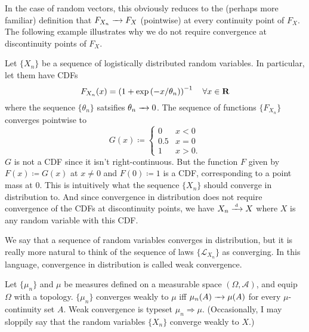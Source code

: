 \documentclass[11pt,letterpaper,reqno,oneside]{article}
\begin{document}
In the case of random vectors, this obviously reduces to the (perhaps more familiar) definition that $F_{X_n} \xrightarrow{\;\;\;} F_X$ (pointwise) at every continuity point of $F_X$. The following example illustrates why we do not require convergence at discontinuity points of $F_X$.
%
\begin{example}
	Let $\{X_n\}$ be a sequence of logistically distributed random variables. In particular, let them have CDFs
	\begin{equation*}
		F_{X_n}(x) = \left( 1 + \exp\left( -x / \theta_n \right) \right)^{-1}
		\quad\forall x \in \mathbf{R}
	\end{equation*}
	where the sequence $\{\theta_n\}$ satsifies $\theta_n \xrightarrow{\;\;\;} 0$. The sequence of functions $\{ F_{X_n} \}$ converges pointwise to
	\begin{equation*}
		G(x) \coloneqq
		\begin{cases}
			0 & x < 0 \\
			0.5 & x = 0 \\
			1 & x > 0 .
		\end{cases} 
	\end{equation*}
	$G$ is not a CDF since it isn't right-continuous. But the function $F$ given by $F(x) \coloneqq G(x)$ at $x \neq 0$ and $F(0) \coloneqq 1$ is a CDF, corresponding to a point mass at $0$. This is intuitively what the sequence $\{ X_n \}$ should converge in distribution to. And since convergence in distribution does not require convergence of the CDFs at discontinuity points, we have $X_n \xrightarrow{{\scriptscriptstyle \mathrm{\;d\;}}} X$ where $X$ is any random variable with this CDF.
\end{example}


We say that a sequence of random variables converges in distribution, but it is really more natural to think of the sequence of laws $\{ \mathcal{L}_{X_n} \}$ as converging. In this language, convergence in distribution is called weak convergence.
%
\begin{definition}
	Let $\{ \mu_n \}$ and $\mu$ be measures defined on a measurable space $(\Omega,\mathcal{A})$, and equip $\Omega$ with a topology. $\{ \mu_n \}$ converges weakly to $\mu$ iff $\mu_n(A) \xrightarrow{\;\;\;} \mu(A)$ for every $\mu$-continuity set $A$. Weak convergence is typeset $\mu_n \Rightarrow \mu$. (Occasionally, I may sloppily say that the random variables $\{X_n\}$ converge weakly to $X$.)
\end{definition}
\end{document}
